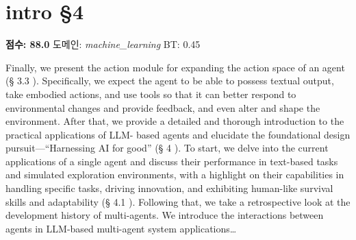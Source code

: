 \documentclass[11pt,a4paper,oneside]{memoir}
\begin{document}
\section{intro §4}
\noindent \textbf{\color{ScoreGreen}점수: 88.0} \quad 도메인: \textit{machine\_learning}  \quad \textcolor{ScoreRed}{BT: 0.45}
\vspace{0.4em}

\begin{tcolorbox}[origstyle]
\small Finally, we present the action module for expanding the action space of an agent (§ 3.3 ). Specifically, we expect the agent to be able to possess textual output, take embodied actions, and use tools so that it can better respond to environmental changes and provide feedback, and even alter and shape the environment. After that, we provide a detailed and thorough introduction to the practical applications of LLM- based agents and elucidate the foundational design pursuit—“Harnessing AI for good” (§ 4 ). To start, we delve into the current applications of a single agent and discuss their performance in text-based tasks and simulated exploration environments, with a highlight on their capabilities in handling specific tasks, driving innovation, and exhibiting human-like survival skills and adaptability (§ 4.1 ). Following that, we take a retrospective look at the development history of multi-agents. We introduce the interactions between agents in LLM-based multi-agent system applications\ldots
\end{tcolorbox}
\vspace{0.3em}
\end{document}
